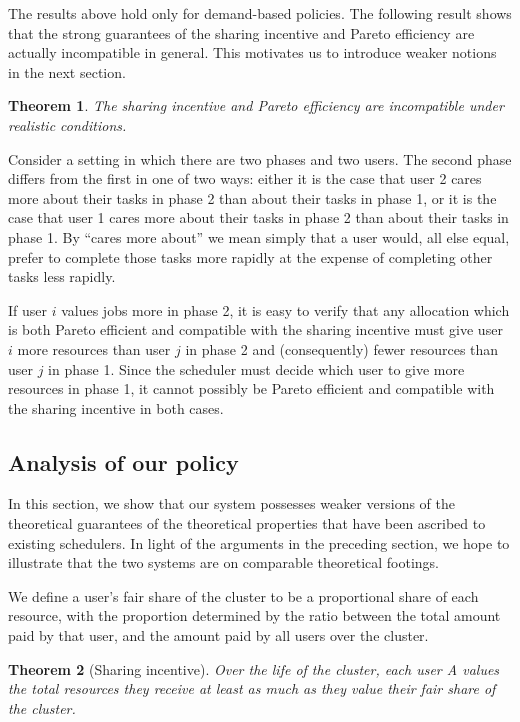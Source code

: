 \documentclass{acm_proc_article-sp}
\newtheorem{theorem}{Theorem}[section]
\newenvironment{pproof}[1][Proof]{\begin{trivlist}
\item[\hskip \labelsep {\bfseries #1}]}{\end{trivlist}}
\begin{document}
The results above hold only for demand-based policies.
The following result shows that the strong guarantees of the sharing
incentive and Pareto efficiency are actually incompatible in general.
This motivates us to introduce weaker notions in the next section.
\begin{theorem}\label{no-efficiency}
The sharing incentive and Pareto efficiency are incompatible under realistic conditions.
\end{theorem}
\begin{pproof}
Consider a setting in which there are two phases and two users. 
The second phase differs from the first in one of two ways: 
either it is the case that user 2 cares more about their tasks in phase 2 than about their tasks in phase 1, 
or it is the case that user 1 cares more about their tasks in phase 2 than about their tasks in phase 1. 
By ``cares more about'' we mean simply that a user would, all else equal, 
prefer to complete those tasks more rapidly at the expense of completing other tasks less rapidly.

If user $i$ values jobs more in phase 2, it is easy to verify that any allocation which is both Pareto efficient and compatible with the sharing incentive must give user $i$ 
more resources than user $j$ in phase 2 and (consequently) fewer resources than user $j$ in phase 1. 
Since the scheduler must decide which user to give more resources in phase 1, it cannot possibly be Pareto efficient and compatible with the sharing incentive in both cases.
\end{pproof}

\subsection{Analysis of our policy}
In this section, we show that our system possesses weaker versions of the theoretical guarantees of the theoretical properties that have been ascribed to existing schedulers. In light of the arguments in the preceding section, we hope to illustrate that the two systems are on comparable theoretical footings.

We define a user's fair share of the cluster to be a proportional share of each resource, with the proportion determined by the ratio between the total amount paid by that user, and the amount paid by all users over the cluster. 

\begin{theorem}[Sharing incentive]
Over the life of the cluster, each user A values the total resources they receive at least as much as they value their fair share of the cluster. 
\end{theorem}
\end{document}
